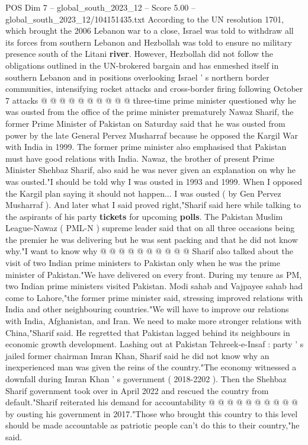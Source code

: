 \begin{textsample}{POS Dim 7 – global\_south\_2023\_12 – Score 5.00 – global\_south\_2023\_12/104151435.txt}
According to the UN resolution 1701, which brought the 2006 Lebanon war to a close, Israel was told to withdraw all its forces from southern Lebanon and Hezbollah was told to ensure no military presence south of the Litani \textbf{river}.
However, Hezbollah did not follow the obligations outlined in the UN-brokered bargain and has enmeshed itself in southern Lebanon and in positions overlooking Israel ' s northern border communities, intensifying rocket attacks and cross-border firing following October 7 attacks @ @ @ @ @ @ @ @ @ @ three-time prime minister questioned why he was ousted from the office of the prime minister prematurely Nawaz Sharif, the former Prime Minister of Pakistan on Saturday said that he was ousted from power by the late General Pervez Musharraf because he opposed the Kargil War with India in 1999.
The former prime minister also emphasised that Pakistan must have good relations with India.
Nawaz, the brother of present Prime Minister Shehbaz Sharif, also said he was never given an explanation on why he was ousted."I should be told why I was ousted in 1993 and 1999.
When I opposed the Kargil plan saying it should not happen...
I was ousted ( by Gen Pervez Musharraf ).
And later what I said proved right,"Sharif said here while talking to the aspirants of his party \textbf{tickets} for upcoming \textbf{polls}.
The Pakistan Muslim League-Nawaz ( PML-N ) supreme leader said that on all three occasions being the premier he was delivering but he was sent packing and that he did not know why."I want to know why @ @ @ @ @ @ @ @ @ @ Sharif also talked about the visit of two Indian prime ministers to Pakistan only when he was the prime minister of Pakistan."We have delivered on every front.
During my tenure as PM, two Indian prime ministers visited Pakistan.
Modi sahab and Vajpayee sahab had come to Lahore,"the former prime minister said, stressing improved relations with India and other neighbouring countries."We will have to improve our relations with India, Afghanistan, and Iran.
We need to make more stronger relations with China,"Sharif said.
He regretted that Pakistan lagged behind its neighbours in economic growth development.
Lashing out at Pakistan Tehreek-e-Insaf : party ' s jailed former chairman Imran Khan, Sharif said he did not know why an inexperienced man was given the reins of the country."The economy witnessed a downfall during Imran Khan ' s government ( 2018-2202 ).
Then the Shehbaz Sharif government took over in April 2022 and rescued the country from default."Sharif reiterated his demand for accountability @ @ @ @ @ @ @ @ @ @ by ousting his government in 2017."Those who brought this country to this level should be made accountable as patriotic people can't do this to their country,"he said.

\end{textsample}

